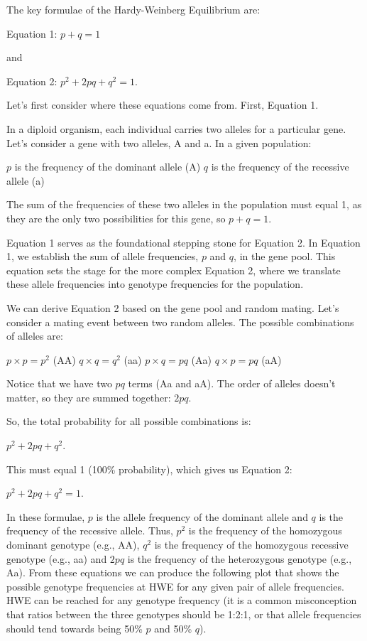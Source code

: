 \documentclass[
  a4paper]{book}
\begin{document}
The key formulae of the Hardy-Weinberg Equilibrium are:

Equation 1: \(p + q = 1\)

and

Equation 2: \(p^2 + 2pq + q^2 = 1\).

Let's first consider where these equations come from. First, Equation 1.

In a diploid organism, each individual carries two alleles for a particular gene. Let's consider a gene with two alleles, A and a. In a given population:

\(p\) is the frequency of the dominant allele (A)
\(q\) is the frequency of the recessive allele (a)

The sum of the frequencies of these two alleles in the population must equal 1, as they are the only two possibilities for this gene, so \(p+q=1\).

Equation 1 serves as the foundational stepping stone for Equation 2. In Equation 1, we establish the sum of allele frequencies, \(p\) and \(q\), in the gene pool. This equation sets the stage for the more complex Equation 2, where we translate these allele frequencies into genotype frequencies for the population.

We can derive Equation 2 based on the gene pool and random mating. Let's consider a mating event between two random alleles. The possible combinations of alleles are:

\(p \times p = p^2\) (AA)
\(q \times q = q^2\) (aa)
\(p \times q = pq\) (Aa)
\(q \times p = pq\) (aA)

Notice that we have two \(pq\) terms (Aa and aA). The order of alleles doesn't matter, so they are summed together: \(2pq\).

So, the total probability for all possible combinations is:

\(p^2 + 2pq + q^2\).

This must equal 1 (100\% probability), which gives us Equation 2:

\(p^2 + 2pq + q^2 = 1\).

In these formulae, \(p\) is the allele frequency of the dominant allele and \(q\) is the frequency of the recessive allele. Thus, \(p^2\) is the frequency of the homozygous dominant genotype (e.g., AA), \(q^2\) is the frequency of the homozygous recessive genotype (e.g., aa) and \(2pq\) is the frequency of the heterozygous genotype (e.g., Aa). From these equations we can produce the following plot that shows the possible genotype frequencies at HWE for any given pair of allele frequencies. HWE can be reached for any genotype frequency (it is a common misconception that ratios between the three genotypes should be 1:2:1, or that allele frequencies should tend towards being 50\% \(p\) and 50\% \(q\)).
\end{document}
